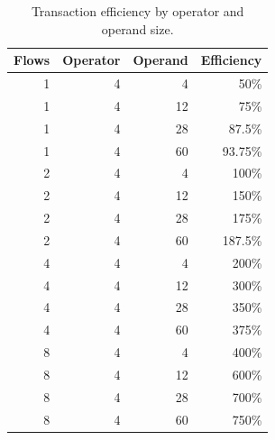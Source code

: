 \documentclass[../../../OAE-SPEC-MAIN.tex]{subfiles}
\begin{document}







\begin{table}[ht]
\centering
\caption{Transaction efficiency by operator and operand size.}
\label{tab:txn-efficiency}

\footnotesize
\setlength{\tabcolsep}{3pt} %
\begin{tabular}{@{}r r r r@{}}
\toprule
Flows & Operator & Operand & Efficiency \\ \midrule
1 & 4 & 4  & 50\%   \\
1 & 4 & 12 & 75\%   \\
1 & 4 & 28 & 87.5\% \\
1 & 4 & 60 & 93.75\%\\
2 & 4 & 4  & 100\%  \\
2 & 4 & 12 & 150\%  \\
2 & 4 & 28 & 175\%  \\
2 & 4 & 60 & 187.5\%\\
4 & 4 & 4  & 200\%  \\
4 & 4 & 12 & 300\%  \\
4 & 4 & 28 & 350\%  \\
4 & 4 & 60 & 375\%  \\
8 & 4 & 4  & 400\%  \\
8 & 4 & 12 & 600\%  \\
8 & 4 & 28 & 700\%  \\
8 & 4 & 60 & 750\%  \\ \bottomrule
\end{tabular}
\end{table}
\end{document}
